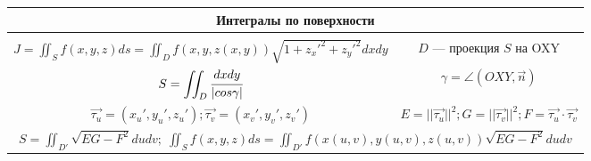 \begin{tabular}{c|c}
	    \multicolumn{2}{c}{Интегралы по поверхности} \\
	\hline\\

	$\displaystyle J = \iint_S f(x,y,z)ds = \iint_D f(x,y,z(x,y))\sqrt{
	1+z_x'^2+z_y'^2}dxdy$ & $D$ --- проекция $S$ на OXY \\[0.5cm]
	
	$\displaystyle S = \iint_D \cfrac{dxdy}{|cos \gamma|}$ & $\gamma = \angle(OXY, \vec{n})$ \\[0.5cm]
	
	$\displaystyle \vec{\tau_u} = (x_u',y_u',z_u'); \vec{\tau_v} = (x_v',y_v',z_v') $ & $ \displaystyle E = ||\vec{\tau_u}||^2; G = ||\vec{\tau_v}||^2; F = \vec{\tau_u} \cdot \vec{\tau_v}$ \\[0.5cm]
	
	\multicolumn{2}{c}{$\displaystyle S = \iint_{D'}\sqrt{EG - F^2}dudv;\;\displaystyle \iint_S f(x,y,z)ds = \iint_{D'}f(x(u,v),y(u,v),z(u,v))\sqrt{EG - F^2}dudv$} \\[0.5cm]
	\hline
\end{tabular}